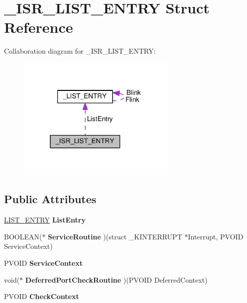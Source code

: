 \hypertarget{struct__ISR__LIST__ENTRY}{}\section{\+\_\+\+I\+S\+R\+\_\+\+L\+I\+S\+T\+\_\+\+E\+N\+T\+R\+Y Struct Reference}
\label{struct__ISR__LIST__ENTRY}


Collaboration diagram for \+\_\+\+I\+S\+R\+\_\+\+L\+I\+S\+T\+\_\+\+E\+N\+T\+R\+Y\+:
\nopagebreak
\begin{figure}[H]
\begin{center}
\leavevmode
\includegraphics[width=217pt]{struct__ISR__LIST__ENTRY__coll__graph}
\end{center}
\end{figure}
\subsection*{Public Attributes}
\begin{DoxyCompactItemize}
\item 
\hypertarget{struct__ISR__LIST__ENTRY_a9d266bda6f1665f4bbb78512a21c62a7}{}\hyperlink{struct__LIST__ENTRY}{L\+I\+S\+T\+\_\+\+E\+N\+T\+R\+Y} {\bfseries List\+Entry}\label{struct__ISR__LIST__ENTRY_a9d266bda6f1665f4bbb78512a21c62a7}

\item 
\hypertarget{struct__ISR__LIST__ENTRY_adc687064e8dea24cf327a709b4481855}{}B\+O\+O\+L\+E\+A\+N($\ast$ {\bfseries Service\+Routine} )(struct \+\_\+\+K\+I\+N\+T\+E\+R\+R\+U\+P\+T $\ast$Interrupt, P\+V\+O\+I\+D Service\+Context)\label{struct__ISR__LIST__ENTRY_adc687064e8dea24cf327a709b4481855}

\item 
\hypertarget{struct__ISR__LIST__ENTRY_ad45f8e1a35ea6d4616ad594351e3e359}{}P\+V\+O\+I\+D {\bfseries Service\+Context}\label{struct__ISR__LIST__ENTRY_ad45f8e1a35ea6d4616ad594351e3e359}

\item 
\hypertarget{struct__ISR__LIST__ENTRY_aad9e386f09ebee92d47010ed03988a53}{}void($\ast$ {\bfseries Deferred\+Port\+Check\+Routine} )(P\+V\+O\+I\+D Deferred\+Context)\label{struct__ISR__LIST__ENTRY_aad9e386f09ebee92d47010ed03988a53}

\item 
\hypertarget{struct__ISR__LIST__ENTRY_ac2bb33a6197dd2914aaa84e981adeb4d}{}P\+V\+O\+I\+D {\bfseries Check\+Context}\label{struct__ISR__LIST__ENTRY_ac2bb33a6197dd2914aaa84e981adeb4d}

\end{DoxyCompactItemize}


